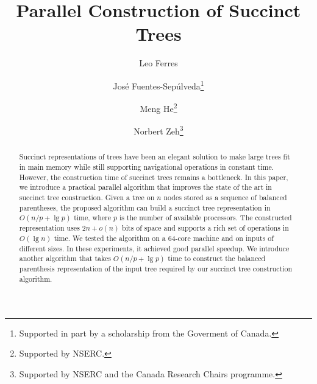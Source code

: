 \documentclass[runningheads]{llncs}
\begin{document}
\title{Parallel Construction of Succinct Trees}

\author{Leo Ferres
  \and
  Jos\'e Fuentes-Sep\'ulveda\fnmsep\thanks{Supported
    in part by a scholarship from the Goverment of Canada.}
  \and
  Meng He\fnmsep\thanks{Supported by NSERC.}
  \and
  Norbert Zeh\fnmsep\thanks{Supported by NSERC and the Canada Research
    Chairs programme.}}




\maketitle

\begin{abstract}
  Succinct representations of trees have been an elegant solution to make large
  trees fit in main memory while still supporting navigational operations in
  constant time.
  However, the construction time of succinct trees remains a bottleneck.
  In this paper, we introduce a practical parallel algorithm that improves the
  state of the art in succinct tree construction.
  Given a tree on $n$ nodes stored as a sequence of balanced parentheses, the
  proposed algorithm can build a succinct tree representation in $O(n/p+\lg p)$
  time, where $p$ is the number of available processors.
  The constructed representation uses $2n + o(n)$
  bits of space and supports a rich set of operations in $O(\lg n)$ time.
  We tested the algorithm on a $64$-core machine and on inputs of different
  sizes.
  In these experiments, it achieved good parallel speedup.
  We introduce another algorithm that takes $O(n/p + \lg p)$ time to construct
  the balanced parenthesis representation of the input tree required by our
  succinct tree construction algorithm.
\end{abstract}
%

\end{document}
